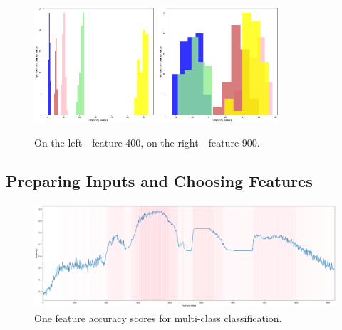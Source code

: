 \documentclass[11pt]{article}
\begin{document}
		\begin{figure}
			\hfill
				\includegraphics[width=0.4\textwidth]{png/400_multi.png}
			\hfill
				\includegraphics[width=0.4\textwidth]{png/900_multi.png}
			\hfill
			\label{fig:400_900}
			\caption{On the left - feature 400, on the right - feature 900.}
		\end{figure}

		\subsection{Preparing Inputs and Choosing Features}
			\begin{figure}[H]
				\includegraphics[width=1\textwidth]{png/multi_one}
				\caption{One feature accuracy scores for multi-class classification.}
				\label{fig:multi_one}
			\end{figure}
\end{document}
